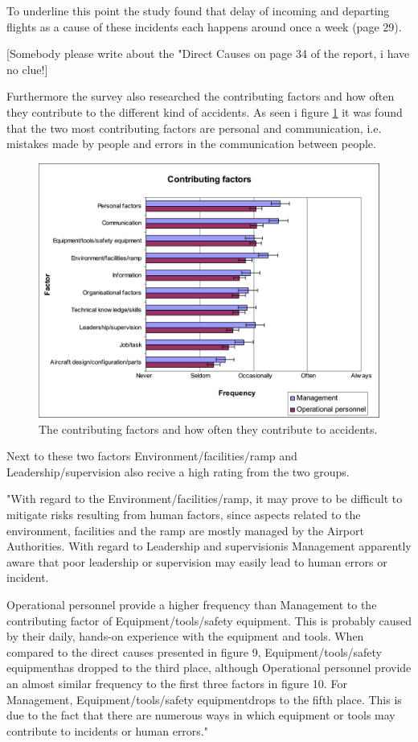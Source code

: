 To underline this point the study found that delay of incoming and departing flights as a cause of these incidents each happens around once a week (page 29).

[Somebody please write about the "Direct Causes on page 34 of the report, i have no clue!]

Furthermore the survey also researched the contributing factors and how often they contribute to the different kind of accidents. As seen i figure \ref{ContributingFactors} it was found that the two most contributing factors are personal and communication, i.e. mistakes made by people and errors in the communication between people.

\begin{figure}[!h]
\centering
\includegraphics[width=\textwidth]{Grafik/ContributingFactors}
\caption{The contributing factors and how often they contribute to accidents.}
\label{ContributingFactors}
\end{figure}

Next to these two factors Environment/facilities/ramp and Leadership/supervision also recive a high rating from the two groups. 

"With regard to the Environment/facilities/ramp, it may prove to be difficult to mitigate risks resulting from human factors, since aspects related to the environment, facilities and the ramp are mostly managed by the Airport Authorities. With regard to Leadership and supervisionis Management apparently aware that poor leadership or supervision may easily lead to human errors or incident.

Operational personnel provide a higher frequency than Management to the contributing factor of Equipment/tools/safety equipment. This is probably caused by their daily, hands-on experience with the equipment and tools. When compared to the direct causes presented in figure 9, Equipment/tools/safety equipmenthas dropped to the third place, although Operational personnel provide an almost similar frequency to the first three factors in figure 10. For Management, Equipment/tools/safety equipmentdrops to the fifth place. This is due to the fact that there are numerous ways in which equipment or tools may contribute to incidents or human errors."

